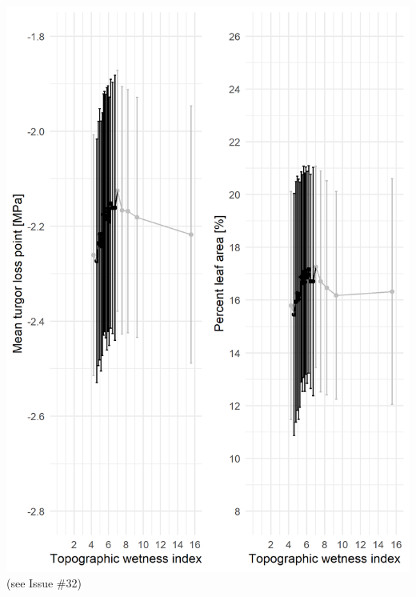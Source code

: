 \documentclass[]{article}
\begin{document}
\includegraphics{tables_figures/FigureS1.png} (see Issue \#32)


\end{document}
